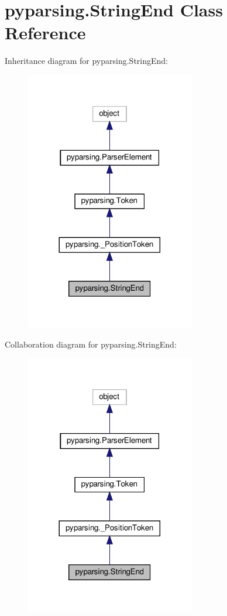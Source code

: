 \hypertarget{classpyparsing_1_1StringEnd}{}\section{pyparsing.\+String\+End Class Reference}
\label{classpyparsing_1_1StringEnd}


Inheritance diagram for pyparsing.\+String\+End\+:
\nopagebreak
\begin{figure}[H]
\begin{center}
\leavevmode
\includegraphics[width=209pt]{classpyparsing_1_1StringEnd__inherit__graph}
\end{center}
\end{figure}


Collaboration diagram for pyparsing.\+String\+End\+:
\nopagebreak
\begin{figure}[H]
\begin{center}
\leavevmode
\includegraphics[width=209pt]{classpyparsing_1_1StringEnd__coll__graph}
\end{center}
\end{figure}
